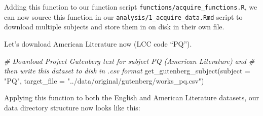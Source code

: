 \documentclass[
]{article}
\newenvironment{Shaded}{\begin{snugshade}}{\end{snugshade}}
\newcommand{\AttributeTok}[1]{\textcolor[rgb]{0.77,0.63,0.00}{#1}}
\newcommand{\CommentTok}[1]{\textcolor[rgb]{0.56,0.35,0.01}{\textit{#1}}}
\newcommand{\ControlFlowTok}[1]{\textcolor[rgb]{0.13,0.29,0.53}{\textbf{#1}}}
\newcommand{\FunctionTok}[1]{\textcolor[rgb]{0.00,0.00,0.00}{#1}}
\newcommand{\NormalTok}[1]{#1}
\newcommand{\OtherTok}[1]{\textcolor[rgb]{0.56,0.35,0.01}{#1}}
\newcommand{\SpecialCharTok}[1]{\textcolor[rgb]{0.00,0.00,0.00}{#1}}
\newcommand{\StringTok}[1]{\textcolor[rgb]{0.31,0.60,0.02}{#1}}
\begin{document}
\begin{Shaded}
\end{Shaded}

Adding this function to our function script \texttt{functions/acquire\_functions.R}, we can now source this function in our \texttt{analysis/1\_acquire\_data.Rmd} script to download multiple subjects and store them in on disk in their own file.

Let's download American Literature now (LCC code ``PQ'').

\begin{Shaded}
\begin{Highlighting}[]
\CommentTok{\# Download Project Gutenberg text for subject \textquotesingle{}PQ\textquotesingle{} (American Literature) and}
\CommentTok{\# then write this dataset to disk in .csv format}
\FunctionTok{get\_gutenberg\_subject}\NormalTok{(}\AttributeTok{subject =} \StringTok{"PQ"}\NormalTok{, }\AttributeTok{target\_file =} \StringTok{"../data/original/gutenberg/works\_pq.csv"}\NormalTok{)}
\end{Highlighting}
\end{Shaded}

Applying this function to both the English and American Literature datasets, our data directory structure now looks like this:
\end{document}
